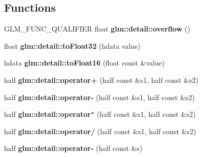 \subsection*{Functions}
\begin{DoxyCompactItemize}
\item 
\hypertarget{namespaceglm_1_1detail_a61efe122333bc00e81c57e0927bfdfb3}{G\-L\-M\-\_\-\-F\-U\-N\-C\-\_\-\-Q\-U\-A\-L\-I\-F\-I\-E\-R float {\bfseries glm\-::detail\-::overflow} ()}\label{namespaceglm_1_1detail_a61efe122333bc00e81c57e0927bfdfb3}

\item 
\hypertarget{namespaceglm_1_1detail_a8e4719d94d99ee1e625496e04317272b}{float {\bfseries glm\-::detail\-::to\-Float32} (hdata value)}\label{namespaceglm_1_1detail_a8e4719d94d99ee1e625496e04317272b}

\item 
\hypertarget{namespaceglm_1_1detail_ac16321696a34b41c55f941b319d50652}{hdata {\bfseries glm\-::detail\-::to\-Float16} (float const \&value)}\label{namespaceglm_1_1detail_ac16321696a34b41c55f941b319d50652}

\item 
\hypertarget{namespaceglm_1_1detail_a2156d538bd360f2cf8eb0259ffd0fcee}{half {\bfseries glm\-::detail\-::operator+} (half const \&s1, half const \&s2)}\label{namespaceglm_1_1detail_a2156d538bd360f2cf8eb0259ffd0fcee}

\item 
\hypertarget{namespaceglm_1_1detail_a95c2e07ba4e13b8ae23147b76624500b}{half {\bfseries glm\-::detail\-::operator-\/} (half const \&s1, half const \&s2)}\label{namespaceglm_1_1detail_a95c2e07ba4e13b8ae23147b76624500b}

\item 
\hypertarget{namespaceglm_1_1detail_a02505d56c5e061fa54725f153fca6160}{half {\bfseries glm\-::detail\-::operator$\ast$} (half const \&s1, half const \&s2)}\label{namespaceglm_1_1detail_a02505d56c5e061fa54725f153fca6160}

\item 
\hypertarget{namespaceglm_1_1detail_a1e1744732d76d7cdc5cbc0eb22a516f5}{half {\bfseries glm\-::detail\-::operator/} (half const \&s1, half const \&s2)}\label{namespaceglm_1_1detail_a1e1744732d76d7cdc5cbc0eb22a516f5}

\item 
\hypertarget{namespaceglm_1_1detail_ad5b647da2740caf9952963ef8f83e25c}{half {\bfseries glm\-::detail\-::operator-\/} (half const \&s)}\label{namespaceglm_1_1detail_ad5b647da2740caf9952963ef8f83e25c}


\end{DoxyCompactItemize}
